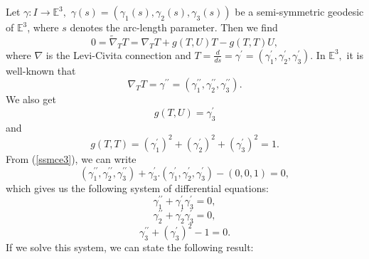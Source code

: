 \documentclass{amsart}
\theoremstyle{plain}
\theoremstyle{definition}
\theoremstyle{remark}
\numberwithin{equation}{section}
\begin{document}
Let $\gamma :I\rightarrow \mathbb{E}^{3},$ $\gamma (s)=\left( \gamma
_{1}(s),\gamma _{2}(s),\gamma _{3}(s)\right) $ be a semi-symmetric geodesic
of $\mathbb{E}^{3}$, where $s$ denotes the arc-length parameter. Then we
find 
\begin{equation}
0=\widetilde{\nabla }_{T}T=\nabla _{T}T+g(T,U)T-g(T,T)U,  \label{ssmce3}
\end{equation}%
where $\nabla $ is the Levi-Civita connection and $T=\frac{d}{ds}=\gamma
^{\prime }=\left( \gamma _{1}^{\prime },\gamma _{2}^{\prime },\gamma
_{3}^{\prime }\right) $. In $\mathbb{E}^{3},$ it is well-known that 
\begin{equation*}
\nabla _{T}T=\gamma ^{\prime \prime }=\left( \gamma _{1}^{\prime \prime
},\gamma _{2}^{\prime \prime },\gamma _{3}^{\prime \prime }\right) .
\end{equation*}%
We also get 
\begin{equation*}
g(T,U)=\gamma _{3}^{\prime }
\end{equation*}%
and%
\begin{equation}
g(T,T)=\left( \gamma _{1}^{\prime }\right) ^{2}+\left( \gamma _{2}^{\prime
}\right) ^{2}+\left( \gamma _{3}^{\prime }\right) ^{2}=1.  \label{unit-E3}
\end{equation}%
From (\ref{ssmce3}), we can write%
\begin{equation*}
\left( \gamma _{1}^{\prime \prime },\gamma _{2}^{\prime \prime },\gamma
_{3}^{\prime \prime }\right) +\gamma _{3}^{\prime }.\left( \gamma
_{1}^{\prime },\gamma _{2}^{\prime },\gamma _{3}^{\prime }\right) -\left(
0,0,1\right) =0,
\end{equation*}%
which gives us the following system of differential equations: 
\begin{equation*}
\gamma _{1}^{\prime \prime }+\gamma _{1}^{\prime }\gamma _{3}^{\prime }=0,
\end{equation*}%
\begin{equation*}
\gamma _{2}^{\prime \prime }+\gamma _{2}^{\prime }\gamma _{3}^{\prime }=0,
\end{equation*}%
\begin{equation*}
\gamma _{3}^{\prime \prime }+\left( \gamma _{3}^{\prime }\right) ^{2}-1=0.
\end{equation*}%
If we solve this system, we can state the following result:
\end{document}
